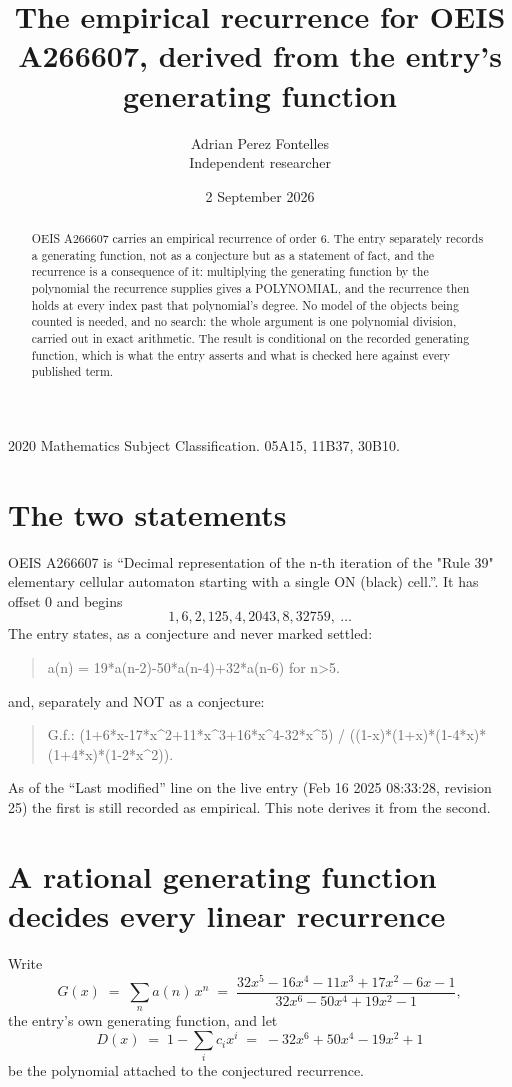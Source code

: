 \documentclass[11pt,a4paper]{article}
\title{The empirical recurrence for OEIS A266607, derived from the entry's generating function}
\author{Adrian Perez Fontelles\\ \small Independent researcher}
\date{2 September 2026}
\theoremstyle{plain}
\theoremstyle{definition}
\begin{document}
\maketitle

\begin{abstract}
OEIS A266607 carries an empirical recurrence of order $6$. The entry separately records a
generating function, not as a conjecture but as a statement of fact, and the recurrence is a
consequence of it: multiplying the generating function by the polynomial the recurrence
supplies gives a POLYNOMIAL, and the recurrence then holds at every index past that
polynomial's degree. No model of the objects being counted is needed, and no search: the
whole argument is one polynomial division, carried out in exact arithmetic. The result is
conditional on the recorded generating function, which is what the entry asserts and what is
checked here against every published term.
\end{abstract}

\noindent\small 2020 Mathematics Subject Classification. 05A15, 11B37, 30B10.\normalsize

\section{The two statements}

OEIS A266607 is ``Decimal representation of the n-th iteration of the "Rule 39" elementary cellular automaton starting with a single ON (black) cell.''. It has offset $0$ and begins
\[
1, 6, 2, 125, 4, 2043, 8, 32759,\ \dots
\]
The entry states, as a conjecture and never marked settled:
\begin{quote}
a(n) = 19*a(n-2)-50*a(n-4)+32*a(n-6) for n>5.
\end{quote}
and, separately and NOT as a conjecture:
\begin{quote}
G.f.: (1+6*x-17*x\^{}2+11*x\^{}3+16*x\^{}4-32*x\^{}5) / ((1-x)*(1+x)*(1-4*x)*(1+4*x)*(1-2*x\^{}2)).
\end{quote}
As of the ``Last modified'' line on the live entry (Feb 16 2025 08:33:28, revision 25) the first is still
recorded as empirical. This note derives it from the second.

\section{A rational generating function decides every linear recurrence}

Write
\[
G(x)\;=\;\sum_{n}a(n)\,x^{n}\;=\;\frac{32 x^{5} - 16 x^{4} - 11 x^{3} + 17 x^{2} - 6 x - 1}{32 x^{6} - 50 x^{4} + 19 x^{2} - 1},
\]
the entry's own generating function, and let
\[
D(x)\;=\;1-\sum_i c_i x^{i}\;=\;- 32 x^{6} + 50 x^{4} - 19 x^{2} + 1
\]
be the polynomial attached to the conjectured recurrence.
\end{document}
